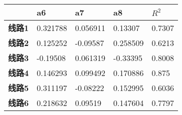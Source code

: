 \documentclass[12pt,a4paper]{ctexart}
\begin{document}
\begin{longtable}{@{}lllll@{}}
	& \textbf{a6}                   & \textbf{a7}                   & \textbf{a8}                   & \textbf{$R^{2}$}                 \\* \cmidrule(l){2-5} 
	\endfirsthead
	\endhead
	\multicolumn{1}{l|}{\textbf{线路1}} & \multicolumn{1}{l|}{0.321788} & \multicolumn{1}{l|}{0.056911} & \multicolumn{1}{l|}{0.13307}  & \multicolumn{1}{l|}{0.7307} \\* \cmidrule(l){2-5} 
	\multicolumn{1}{l|}{\textbf{线路2}} & \multicolumn{1}{l|}{0.125252} & \multicolumn{1}{l|}{-0.09587} & \multicolumn{1}{l|}{0.258509} & \multicolumn{1}{l|}{0.6213} \\* \cmidrule(l){2-5} 
	\multicolumn{1}{l|}{\textbf{线路3}} & \multicolumn{1}{l|}{-0.19508} & \multicolumn{1}{l|}{0.061319} & \multicolumn{1}{l|}{-0.33395} & \multicolumn{1}{l|}{0.8008} \\* \cmidrule(l){2-5} 
	\multicolumn{1}{l|}{\textbf{线路4}} & \multicolumn{1}{l|}{0.146293} & \multicolumn{1}{l|}{0.099492} & \multicolumn{1}{l|}{0.170886} & \multicolumn{1}{l|}{0.875}  \\* \cmidrule(l){2-5} 
	\multicolumn{1}{l|}{\textbf{线路5}} & \multicolumn{1}{l|}{0.311197} & \multicolumn{1}{l|}{-0.08222} & \multicolumn{1}{l|}{0.152995} & \multicolumn{1}{l|}{0.6036} \\* \cmidrule(l){2-5} 
	\multicolumn{1}{l|}{\textbf{线路6}} & \multicolumn{1}{l|}{0.218632} & \multicolumn{1}{l|}{0.09519}  & \multicolumn{1}{l|}{0.147604} & \multicolumn{1}{l|}{0.7797} \\* \cmidrule(l){2-5} 
\end{longtable}
	
\end{document}
